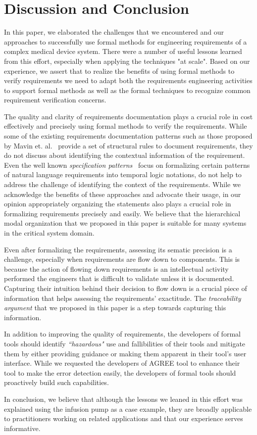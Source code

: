 \section{Discussion and Conclusion}
\label{sec:conclusion}

In this paper, we elaborated the challenges that we encountered and our approaches to successfully use formal methods for engineering requirements of a complex medical device system. There were a number of useful lessons learned from this effort, especially when applying the techniques "at scale". Based on our experience, we assert that to realize the benefits of using formal methods to verify requirements we need to adapt both the requirements engineering activities to support formal methods as well as the formal techniques to recognize common requirement verification concerns.

The quality and clarity of requirements documentation plays a crucial role in cost effectively and precisely using formal methods to verify the requirements. While some of the existing requirements documentation patterns such as those proposed by Mavin et. al.~\cite{mavin2009easy} provide a set of structural rules to document requirements, they do not discuss about identifying the contextual information of the requirement. Even the well known \emph{specification patterns}~\cite{dwyer1999patterns} focus on formalizing certain patterns of natural language requirements into temporal logic notations, do not help to address the challenge of identifying the context of the requirements. While we acknowledge the benefits of these approaches and advocate their usage, in our opinion appropriately organizing the statements also plays a crucial role in formalizing requirements precisely and easily. We believe that the hierarchical modal organization that we proposed in this paper is suitable for many systems in the critical system domain. 

Even after formalizing the requirements, assessing its sematic precision is a challenge, especially when requirements are flow down to components. This is because the action of flowing down requirements is an intellectual activity performed the engineers that is difficult to validate  unless it is documented. Capturing their intuition behind their decision to flow down is a crucial piece of information that helps assessing the requirements' exactitude. The \emph{traceability argument} that we proposed in this paper is a step towards capturing this information.

In addition to improving the quality of requirements, the developers of formal tools should identify \emph{``hazardous"} use and fallibilities of their tools and mitigate them by either providing guidance or making them apparent in their tool's user interface. While we requested the developers of AGREE tool to enhance their tool to make the error detection easily, the developers of formal tools should proactively build such capabilities.

In conclusion, we believe that although the lessons we leaned in this effort was explained using the infusion pump as a case example, they are broadly applicable to practitioners working on related applications and that our experience serves informative.







